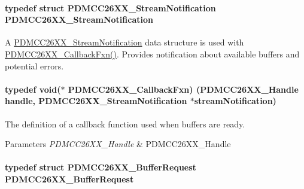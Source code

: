 \paragraph[{P\+D\+M\+C\+C26\+X\+X\+\_\+\+Stream\+Notification}]{\setlength{\rightskip}{0pt plus 5cm}typedef struct {\bf P\+D\+M\+C\+C26\+X\+X\+\_\+\+Stream\+Notification}  {\bf P\+D\+M\+C\+C26\+X\+X\+\_\+\+Stream\+Notification}}\label{_p_d_m_c_c26_x_x_8h_abebd17c183efa14ae0ebe9c229f6c577}


A \hyperlink{struct_p_d_m_c_c26_x_x___stream_notification}{P\+D\+M\+C\+C26\+X\+X\+\_\+\+Stream\+Notification} data structure is used with \hyperlink{_p_d_m_c_c26_x_x_8h_ab6fdee59a79029e938e3fbf0e446fa91}{P\+D\+M\+C\+C26\+X\+X\+\_\+\+Callback\+Fxn()}. Provides notification about available buffers and potential errors. 

\paragraph[{P\+D\+M\+C\+C26\+X\+X\+\_\+\+Callback\+Fxn}]{\setlength{\rightskip}{0pt plus 5cm}typedef void($\ast$ P\+D\+M\+C\+C26\+X\+X\+\_\+\+Callback\+Fxn) ({\bf P\+D\+M\+C\+C26\+X\+X\+\_\+\+Handle} handle, {\bf P\+D\+M\+C\+C26\+X\+X\+\_\+\+Stream\+Notification} $\ast$stream\+Notification)}\label{_p_d_m_c_c26_x_x_8h_ab6fdee59a79029e938e3fbf0e446fa91}


The definition of a callback function used when buffers are ready. 


\begin{DoxyParams}{Parameters}
{\em P\+D\+M\+C\+C26\+X\+X\+\_\+\+Handle} & P\+D\+M\+C\+C26\+X\+X\+\_\+\+Handle \\
\hline
\end{DoxyParams}
\paragraph[{P\+D\+M\+C\+C26\+X\+X\+\_\+\+Buffer\+Request}]{\setlength{\rightskip}{0pt plus 5cm}typedef struct {\bf P\+D\+M\+C\+C26\+X\+X\+\_\+\+Buffer\+Request}  {\bf P\+D\+M\+C\+C26\+X\+X\+\_\+\+Buffer\+Request}}\label{_p_d_m_c_c26_x_x_8h_ae8cebf1f4b5897234e3be6744eb26997}


